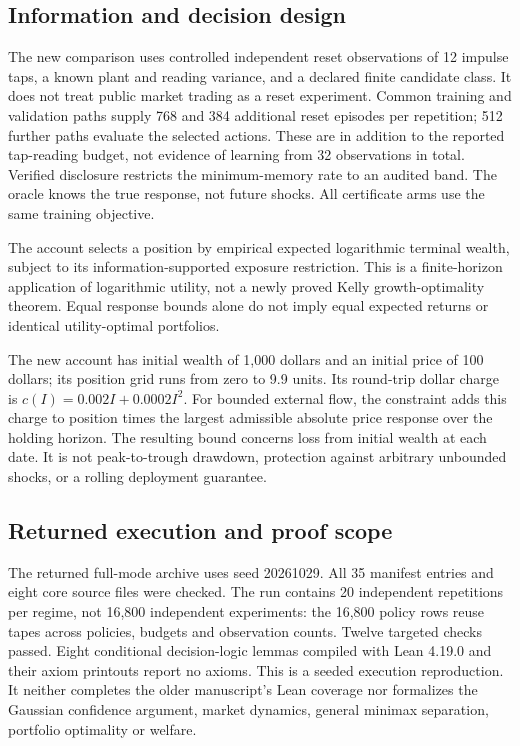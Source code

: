 \documentclass[12pt]{article}
\theoremstyle{definition}
\theoremstyle{remark}
\begin{document}
\subsection*{Information and decision design}
The new comparison uses controlled independent reset observations of 12 impulse
taps, a known plant and reading variance, and a declared finite candidate class.
It does not treat public market trading as a reset experiment. Common training
and validation paths supply 768 and 384 additional reset episodes per repetition;
512 further paths evaluate the selected actions. These are in addition to the
reported tap-reading budget, not evidence of learning from 32 observations in
total. Verified disclosure restricts
the minimum-memory rate to an audited band. The oracle knows the true response,
not future shocks. All certificate arms use the same training objective.

The account selects a position by empirical expected logarithmic terminal
wealth, subject to its information-supported exposure restriction. This is a
finite-horizon application of logarithmic utility, not a newly proved Kelly
growth-optimality theorem. Equal response bounds alone do not imply equal
expected returns or identical utility-optimal portfolios.

The new account has initial wealth of 1,000 dollars and an initial price of
100 dollars; its position grid runs from zero to 9.9 units. Its round-trip
dollar charge is $c(I)=0.002I+0.0002I^2$. For bounded external flow, the
constraint adds this charge to position times the largest admissible absolute
price response over the holding horizon. The resulting bound concerns loss
from initial wealth at each date. It is not peak-to-trough drawdown, protection
against arbitrary unbounded shocks, or a rolling deployment guarantee.

\subsection*{Returned execution and proof scope}
The returned full-mode archive uses seed 20261029. All 35 manifest entries and
eight core source files were checked. The run contains 20 independent
repetitions per regime, not 16,800 independent experiments: the 16,800 policy
rows reuse tapes across policies, budgets and observation counts. Twelve
targeted checks passed. Eight conditional decision-logic lemmas compiled with
Lean 4.19.0 and their axiom printouts report no axioms. This is a seeded
execution reproduction. It neither completes the older manuscript's Lean
coverage nor formalizes the Gaussian confidence argument, market dynamics,
general minimax separation, portfolio optimality or welfare.
\end{document}
